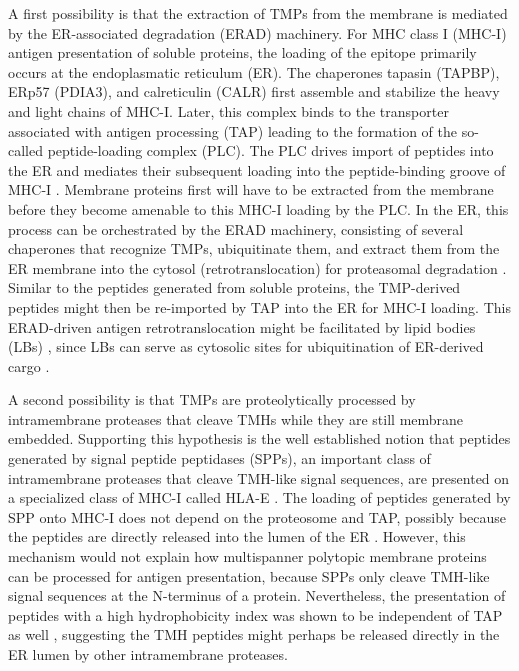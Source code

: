 A first possibility is that the extraction of TMPs from the membrane 
is mediated by the ER-associated degradation (ERAD) machinery. 
For MHC class I (MHC-I) antigen presentation of soluble proteins, 
the loading of the epitope primarily occurs at the endoplasmatic reticulum (ER). 
The chaperones tapasin (TAPBP), ERp57 (PDIA3), 
and calreticulin (CALR) \cite{rock2016present} first assemble 
and stabilize the heavy and light chains of MHC-I. 
Later, this complex binds to the transporter 
associated with antigen processing (TAP) 
leading to the formation of the so-called peptide-loading complex (PLC). 
The PLC drives import of peptides into the ER 
and mediates their subsequent loading into the peptide-binding groove of MHC-I \cite{blees2017structure}. 
Membrane proteins first will have to be extracted from the membrane 
before they become amenable to this MHC-I loading by the PLC. 
In the ER, this process can be orchestrated by the ERAD machinery, 
consisting of several chaperones that recognize TMPs, 
ubiquitinate them, and extract them from the ER membrane 
into the cytosol (retrotranslocation) for proteasomal degradation \cite{preston2017evolving,meusser2005erad}. 
Similar to the peptides generated from soluble proteins, 
the TMP-derived peptides might then be re-imported by TAP 
into the ER for MHC-I loading. 
This ERAD-driven antigen retrotranslocation might be facilitated by lipid bodies (LBs) \cite{bougneres2009role}, 
since LBs can serve as cytosolic sites for ubiquitination of ER-derived cargo \cite{fujimoto2006proteasomal}. 

A second possibility is that TMPs are proteolytically processed 
by intramembrane proteases that cleave TMHs while they are still membrane embedded. Supporting this hypothesis is the well established notion that peptides generated by signal peptide peptidases (SPPs), an important class of intramembrane proteases that cleave TMH-like signal sequences, 
are presented on a specialized class of MHC-I called HLA-E \cite{oliveira2015alternative}. 
The loading of peptides generated by SPP onto MHC-I does not depend on the proteosome and TAP, 
possibly because the peptides are directly released into the lumen of the ER \cite{oliveira2015alternative}. 
However, this mechanism would not explain how multispanner polytopic membrane proteins can be processed for antigen presentation, because SPPs only cleave TMH-like signal sequences at the N-terminus of a protein. 
Nevertheless, the presentation of peptides with a high hydrophobicity index 
was shown to be independent of TAP as well \cite{lautscham2001processing}, 
suggesting the TMH peptides might perhaps be released directly in the ER lumen by other intramembrane proteases. 

